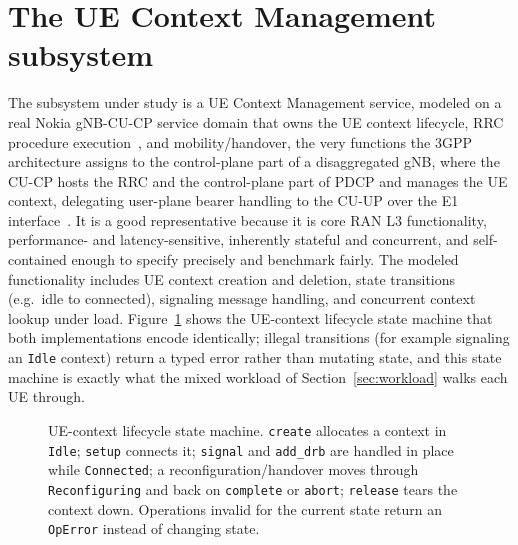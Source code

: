 \documentclass[english,twoside,openright,a4paper,censored,csm,software-track-2020]{HYthesisML}
\begin{document}
\section{The UE Context Management subsystem}
The subsystem under study is a UE Context Management service, modeled on a real Nokia
gNB-CU-CP service domain that owns the UE context lifecycle, RRC procedure
execution~\cite{3gpp38331}, and mobility/handover, the very functions the 3GPP architecture
assigns to the control-plane part of a disaggregated gNB, where the CU-CP hosts the RRC and the
control-plane part of PDCP and manages the UE context, delegating user-plane bearer handling to
the CU-UP over the E1 interface~\cite{3gpp38401,3gpp38300,3gpp38463}. It is a good representative
because it is core RAN L3 functionality,
performance- and latency-sensitive, inherently stateful and concurrent, and self-contained
enough to specify precisely and benchmark fairly. The modeled functionality includes UE
context creation and deletion, state transitions (e.g.\ idle to connected), signaling
message handling, and concurrent context lookup under load. Figure~\ref{fig:fsm} shows the
UE-context lifecycle state machine that both implementations encode identically; illegal
transitions (for example signaling an \texttt{Idle} context) return a typed error rather than
mutating state, and this state machine is exactly what the mixed workload of
Section~\ref{sec:workload} walks each UE through.

\begin{figure}
\centering
{}
\caption{UE-context lifecycle state machine. \texttt{create} allocates a context in
\texttt{Idle}; \texttt{setup} connects it; \texttt{signal} and \texttt{add\_drb} are handled
in place while \texttt{Connected}; a reconfiguration/handover moves through
\texttt{Reconfiguring} and back on \texttt{complete} or \texttt{abort}; \texttt{release}
tears the context down. Operations invalid for the current state return an \texttt{OpError}
instead of changing state.\label{fig:fsm}}
\end{figure}
\end{document}
